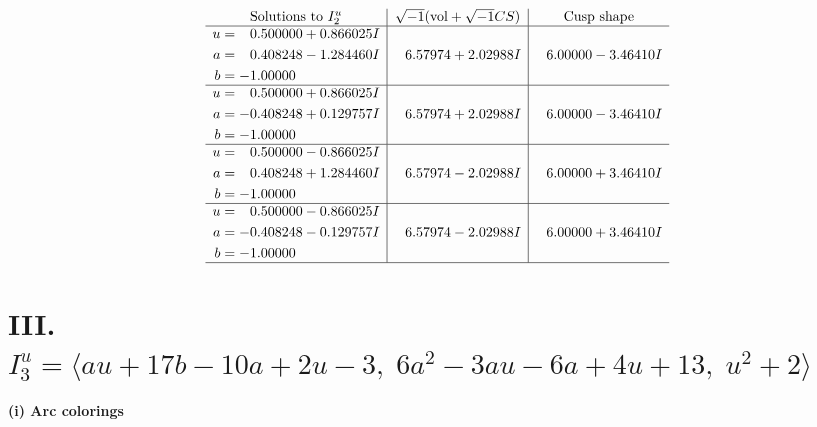 \documentclass[1p]{elsarticle_modified}
\theoremstyle{definition}
\newcommand{\I}{\sqrt{-1}}
\begin{document}
$$\begin{array}{c|c|c}  
\text{Solutions to }I^u_{2}& \I (\text{vol} + \sqrt{-1}CS) & \text{Cusp shape}\\
 \hline 
\begin{aligned}
u &= \phantom{-}0.500000 + 0.866025 I \\
a &= \phantom{-}0.408248 - 1.284460 I \\
b &= -1.00000\phantom{ +0.000000I}\end{aligned}
 & \phantom{-}6.57974 + 2.02988 I & \phantom{-}6.00000 - 3.46410 I \\ \hline\begin{aligned}
u &= \phantom{-}0.500000 + 0.866025 I \\
a &= -0.408248 + 0.129757 I \\
b &= -1.00000\phantom{ +0.000000I}\end{aligned}
 & \phantom{-}6.57974 + 2.02988 I & \phantom{-}6.00000 - 3.46410 I \\ \hline\begin{aligned}
u &= \phantom{-}0.500000 - 0.866025 I \\
a &= \phantom{-}0.408248 + 1.284460 I \\
b &= -1.00000\phantom{ +0.000000I}\end{aligned}
 & \phantom{-}6.57974 - 2.02988 I & \phantom{-}6.00000 + 3.46410 I \\ \hline\begin{aligned}
u &= \phantom{-}0.500000 - 0.866025 I \\
a &= -0.408248 - 0.129757 I \\
b &= -1.00000\phantom{ +0.000000I}\end{aligned}
 & \phantom{-}6.57974 - 2.02988 I & \phantom{-}6.00000 + 3.46410 I\\
 \hline 
 \end{array}$$\newpage\newpage\renewcommand{\arraystretch}{1}
\centering \section*{III. $I^u_{3}= \langle a u+17 b-10 a+2 u-3,\;6 a^2-3 a u-6 a+4 u+13,\;u^2+2 \rangle$}
\flushleft \textbf{(i) Arc colorings}\\
\end{document}
